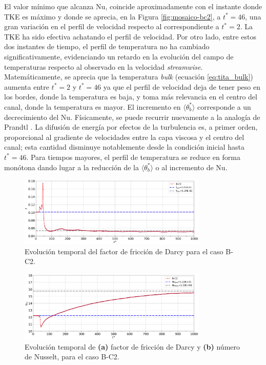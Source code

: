 El valor mínimo que alcanza Nu, coincide aproximadamente con el instante donde TKE es máximo y donde se aprecia, en la Figura \ref{fig:mosaico-bc2}, a $t^*=46$, una gran variación en el perfil de velocidad respecto al correspondiente a $t^*=2$. La TKE ha sido efectiva achatando el perfil de velocidad. Por otro lado, entre estos dos instantes de tiempo, el perfil de temperatura no ha cambiado significativamente, evidenciando un retardo en la evolución del campo de \linebreak temperaturas respecto al observado en la velocidad \textit{streamwise}. Matemáticamente, se aprecia que la temperatura \textit{bulk} (ecuación \ref{eq:tita_bulk}) aumenta entre $t^*=2$ y $t^*=46$ ya que el perfil de velocidad deja de tener peso en los bordes, donde la temperatura es baja, y toma más relevancia en el centro del canal, donde la temperatura es mayor. El incremento en $\langle \theta^*_{b} \rangle$ corresponde a un decrecimiento del Nu. Físicamente, se puede recurrir nuevamente a la analogía de Prandtl \cite{aicher1997}. La difusión de energía por efectos de la turbulencia es, a primer orden, proporcional al gradiente de velocidades entre la capa viscosa y el centro del canal; esta cantidad  disminuye notablemente desde la condición inicial hasta $t^*=46$. Para tiempos mayores, el perfil de temperatura se reduce en forma monótona dando lugar a la reducción de la $\langle \theta^*_{b} \rangle$ o al incremento de Nu.



\begin{figure}[H]
  \centering  
    \includegraphics[width=0.8\textwidth]{figures/cap6/B-C2/Cases_Comp_darcy.png}
   \caption{Evolución temporal del factor de fricción de Darcy para el caso B-C2.}  
    \label{fig:darcy-bc2}
\end{figure}

\newpage

\begin{figure}[H]
  \centering  
    \includegraphics[width=0.8\textwidth]{figures/cap6/B-C2/Cases_Comp_nussel.png}
  \caption{Evolución temporal de \textbf{(a)} factor de fricción de Darcy y \textbf{(b)} número de Nusselt, para el caso B-C2.}
    \label{fig:nu-bc2}
\end{figure}

